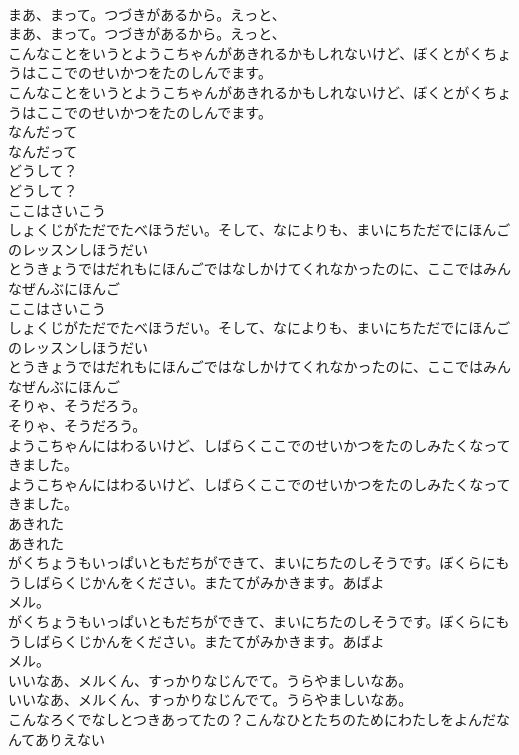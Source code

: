 \documentclass[8pt]{extreport}
\begin{document}
\begin{CJK}{UTF8}{min}
\\	まあ、まって。つづきがあるから。えっと、
\\	まあ、まって。つづきがあるから。えっと、
\\	こんなことをいうとようこちゃんがあきれるかもしれないけど、ぼくとがくちょうはここでのせいかつをたのしんでます。
\\	こんなことをいうとようこちゃんがあきれるかもしれないけど、ぼくとがくちょうはここでのせいかつをたのしんでます。
\\	なんだって
\\	なんだって
\\	どうして？
\\	どうして？
\\	ここはさいこう
\\	しょくじがただでたべほうだい。そして、なによりも、まいにちただでにほんごのレッスンしほうだい
\\	とうきょうではだれもにほんごではなしかけてくれなかったのに、ここではみんなぜんぶにほんご
\\	ここはさいこう
\\	しょくじがただでたべほうだい。そして、なによりも、まいにちただでにほんごのレッスンしほうだい
\\	とうきょうではだれもにほんごではなしかけてくれなかったのに、ここではみんなぜんぶにほんご
\\	そりゃ、そうだろう。
\\	そりゃ、そうだろう。
\\	ようこちゃんにはわるいけど、しばらくここでのせいかつをたのしみたくなってきました。
\\	ようこちゃんにはわるいけど、しばらくここでのせいかつをたのしみたくなってきました。
\\	あきれた
\\	あきれた
\\	がくちょうもいっぱいともだちができて、まいにちたのしそうです。ぼくらにもうしばらくじかんをください。またてがみかきます。あばよ
\\	メル。
\\	がくちょうもいっぱいともだちができて、まいにちたのしそうです。ぼくらにもうしばらくじかんをください。またてがみかきます。あばよ
\\	メル。
\\	いいなあ、メルくん、すっかりなじんでて。うらやましいなあ。
\\	いいなあ、メルくん、すっかりなじんでて。うらやましいなあ。
\\	こんなろくでなしとつきあってたの？こんなひとたちのためにわたしをよんだなんてありえない

\end{CJK}
\end{document}
